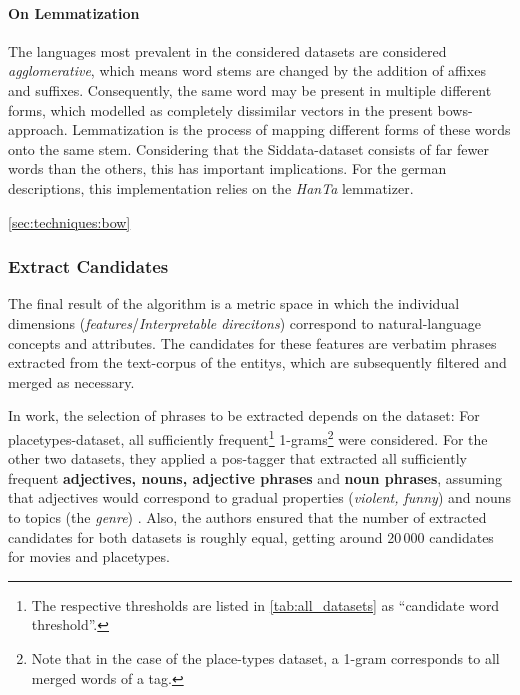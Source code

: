 \paragraph{On Lemmatization}
The languages most prevalent in the considered datasets are considered \textit{agglomerative}, which means word stems are changed by the addition of affixes and suffixes. Consequently, the same word may be present in multiple different forms, which modelled as completely dissimilar vectors in the present \glspl{bow}-approach. Lemmatization is the process of mapping different forms of these words onto the same stem. Considering that the Siddata-dataset consists of far fewer words than the others, this has important implications. For the german descriptions, this implementation relies on the \textit{HanTa} lemmatizer.  %

 \autoref{sec:techniques:bow}


\subsubsection{Extract Candidates}
\label{sec:extract_cands}

The final result of the algorithm is a metric space in which the individual dimensions (\emph{\glspl{feature}}/\emph{Interpretable direcitons}) correspond to natural-language concepts and attributes. The candidates for these features are verbatim phrases extracted from the text-corpus of the \glspl{entity}, which are subsequently filtered and merged as necessary.

In  work, the selection of phrases to be extracted depends on the dataset: For placetypes-dataset, all sufficiently frequent\footnote{\label{fnote:cand_thresholds}The respective thresholds are listed in \autoref{tab:all_datasets} as ``candidate word threshold''.} 1-grams\footnote{Note that in the case of the place-types dataset, a 1-gram corresponds to all merged words of a tag.} were considered. For the other two datasets, they applied a \gls{pos}-tagger that extracted all sufficiently frequent \textbf{adjectives, nouns, adjective phrases} and \textbf{noun phrases}, assuming that adjectives would correspond to gradual properties (\eg \textit{violent, funny}) and nouns to topics (\eg the \textit{genre}) \cite[Sec. 4.2.1]{Derrac2015}. Also, the authors ensured that the number of extracted candidates for both datasets is roughly equal, getting around 20\,000 candidates for movies and placetypes.

